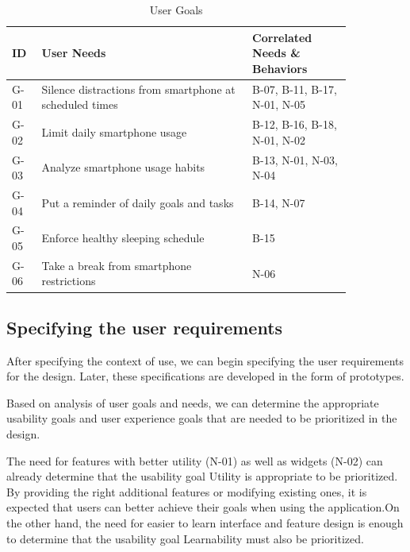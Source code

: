\documentclass[conference]{IEEEtran}
\begin{document}
\RaggedLeft
\begin{table}[htbp]
  \caption{User Goals}
  \begin{footnotesize}
    \begin{center}
      \begin{tabular}{|m{0.07\linewidth}|m{0.53\linewidth}|m{0.25\linewidth}|}
        \hline
      \centering\textbf{ID} & \textbf{User Needs} & \textbf{Correlated Needs \& Behaviors}\\ \hline
      \centering G-01  & Silence distractions from smartphone at scheduled times & B-07, B-11, B-17, N-01, N-05 \\ \hline
      \centering G-02  & Limit daily smartphone usage & B-12, B-16, B-18, N-01, N-02 \\ \hline
      \centering G-03  & Analyze smartphone usage habits & B-13, N-01, N-03, N-04 \\ \hline
      \centering G-04  & Put a reminder of daily goals and tasks & B-14, N-07 \\ \hline
      \centering G-05  & Enforce healthy sleeping schedule & B-15  \\ \hline
      \centering G-06  & Take a break from smartphone restrictions & N-06 \\ \hline
    \end{tabular}
    \label{tab:goals}
  \end{center}
\end{footnotesize}
\end{table}
\justifying

\subsection{Specifying the user requirements}

After specifying the context of use, we can begin specifying the user requirements for the design. Later, these specifications are developed in the form of prototypes.

Based on analysis of user goals and needs, we can determine the appropriate usability goals and user experience goals that are needed to be prioritized in the design.

The need for features with better utility (N-01) as well as widgets (N-02) can already determine that the usability goal Utility is appropriate to be prioritized. By providing the right additional features or modifying existing ones, it is expected that users can better achieve their goals when using the application.On the other hand, the need for easier to learn interface and feature design is enough to determine that the usability goal Learnability must also be prioritized.
\end{document}
